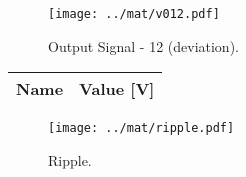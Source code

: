 \begin{figure}[H] \centering
\texttt{[image: ../mat/v012.pdf]}
\caption{Output Signal - 12 (deviation).}
\label{fig:v012}
\end{figure}

\begin{table}[H]
  \centering
  \begin{tabular}{|l|r|}
    \hline    
    {\bf Name} & {\bf Value [V]} \\ \hline
    
  \end{tabular}
  \label{tab:ripple}
\end{table}

\begin{figure}[H] \centering
\texttt{[image: ../mat/ripple.pdf]}
\caption{Ripple.}
\label{fig:ripplegraph}
\end{figure}

